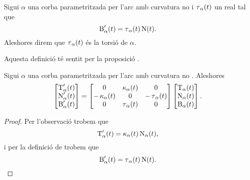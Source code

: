 \documentclass[../Apunts.tex]{subfiles}
\begin{document}
	\begin{definition}[Torsió]
		\label{def:torsió}
		Sigui \(\alpha\) una corba parametritzada per l'arc amb curvatura no \nulla{} i \(\operatorname{\tau}_{\alpha}(t)\) un real tal que
		\[\operatorname{B}'_{\alpha}(t)=\operatorname{\tau}_{\alpha}(t)\operatorname{N}(t).\]
		Aleshores direm que \(\operatorname{\tau}_{\alpha}(t)\) és la torsió de \(\alpha\).
		
		Aquesta definició té sentit per la proposició .
	\end{definition}
	\begin{proposition}
		\label{prop:fórmules de Frenet per corbes parametritzades per l'arc}
		Sigui \(\alpha\) una corba parametritzada per l'arc amb curvatura no \nulla{}. Aleshores
		\[\begin{bmatrix}
			\operatorname{T}'_{\alpha}(t) \\
			\operatorname{N}'_{\alpha}(t) \\
			\operatorname{B}'_{\alpha}(t)
		\end{bmatrix}=
		\begin{bmatrix}
			0 & \operatorname{\kappa}_{\alpha}(t) & 0 \\
			-\operatorname{\kappa}_{\alpha}(t) & 0 & -\operatorname{\tau}_{\alpha}(t) \\
			0 & \operatorname{\tau}_{\alpha}(t) & 0
		\end{bmatrix}
		\begin{bmatrix}
			\operatorname{T}_{\alpha}(t) \\
			\operatorname{N}_{\alpha}(t) \\
			\operatorname{B}_{\alpha}(t)
		\end{bmatrix}.\]
		\begin{proof}
			
			Per l'observació  trobem que
			\begin{equation}
				\label{prop:fórmules de Frenet:eq1}
				\operatorname{T}_{\alpha}'(t)=\operatorname{\kappa}_{\alpha}(t)\operatorname{N}_{\alpha}(t),
			\end{equation}
			i per la definició de  trobem que
			\begin{equation}
				\label{prop:fórmules de Frenet:eq2}
				\operatorname{B}'_{\alpha}(t)=\operatorname{\tau}_{\alpha}(t)\operatorname{N}(t).
			\end{equation}
			

\end{proof}
\end{proposition}
\end{document}
